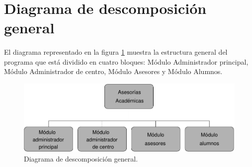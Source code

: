 \section{Diagrama de descomposición general}

  \paragraph{}El diagrama representado en la figura
  \ref{diagramaDescomposicionGeneral} muestra la estructura general del programa
  que está dividido en cuatro bloques: Módulo Administrador principal, Módulo
  Administrador de centro, Módulo Asesores y Módulo Alumnos.

  \begin{figure}[!ht]
    \begin{center}
      \includegraphics[]{11.Disenyo_Arquitectonico/11.2.Diagramas_Descomposicion/11.2.1.General/Diagramas/general.pdf}
      \caption{Diagrama de descomposición general.}
      \label{diagramaDescomposicionGeneral}
    \end{center}
  \end{figure}
